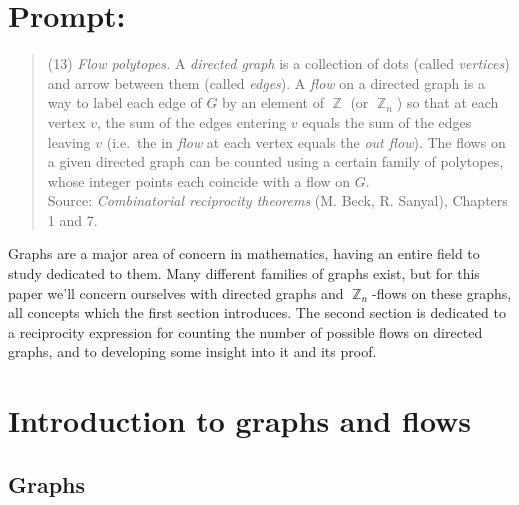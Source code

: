 \documentclass{amsart}
\DeclareMathOperator{\Z}{\mathbb{Z}}
\theoremstyle{plain}
\theoremstyle{remark}
\theoremstyle{definition}
\begin{document}
%
%
%

\section*{Prompt:}

\noindent
\begin{quote}
  (13) \emph{Flow polytopes.}
  A \emph{directed graph} is a collection of dots (called \emph{vertices}) and
  arrow between them (called \emph{edges}). A \emph{flow} on a directed graph is a
  way to label each edge of $G$ by an element of $\Z$ (or $\Z_n$) so that at each
  vertex $v$, the sum of the edges entering $v$ equals the sum of the edges
  leaving $v$ (i.e.\ the in \emph{flow} at each vertex equals the \emph{out
  flow}). The flows on a given directed graph can be counted using a certain
  family of polytopes, whose integer points each coincide with a flow on $G$.
  \\[1em]
  \noindent
  Source:
  \emph{Combinatorial reciprocity theorems} (M. Beck, R. Sanyal), Chapters 1 and 7.
\end{quote}

\hrulefill

Graphs are a major area of concern in mathematics, having an entire field to
study dedicated to them. Many different families of graphs exist, but for this
paper we'll concern ourselves with directed graphs and $\Z_n$-flows on these
graphs, all concepts which the first section introduces. The second section
is dedicated to a reciprocity expression for counting the number of possible
flows on directed graphs, and to developing some insight into it and its proof.



\section{Introduction to graphs and flows}

\subsection{Graphs}
\end{document}
